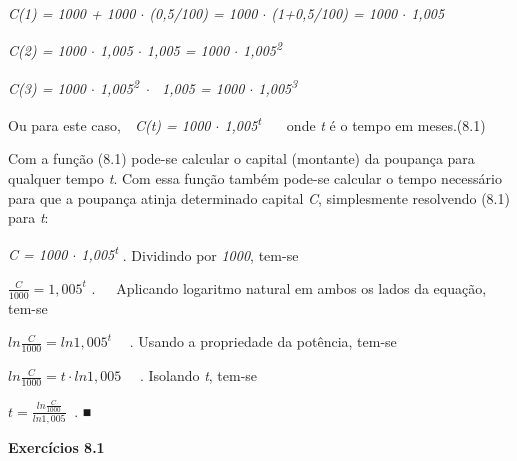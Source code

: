 \documentclass[12pt]{article}
\begin{document}
\vspace{\baselineskip}
\textit{C(1) = 1000 + 1000 $ \cdot $  (0,5/100) = 1000 $ \cdot $  (1+0,5/100) = 1000 $ \cdot $  1,005}\par


\vspace{\baselineskip}
\textit{C(2) = 1000 $ \cdot $  1,005 $ \cdot $  1,005 = 1000 $ \cdot $  1,005\textsuperscript{2}}\par


\vspace{\baselineskip}
\textit{C(3) = 1000 $ \cdot $  1,005\textsuperscript{2}\  $ \cdot $ \ 1,005 =  1000 $ \cdot $  1,005\textsuperscript{3}}\par


\vspace{\baselineskip}
Ou para este caso,\ \  \textit{C(t) = 1000 $ \cdot $  1,005\textsuperscript{t}} \ \ \  onde \textit{t} é o tempo em meses.\tab (8.1)\par


\vspace{\baselineskip}
Com a função (8.1) pode-se calcular o capital (montante) da poupança para qualquer tempo \textit{t}. Com essa função também pode-se calcular o tempo necessário para que a poupança atinja determinado capital \textit{C}, simplesmente resolvendo (8.1) para \textit{t}:\par


\vspace{\baselineskip}
\textit{C = 1000 $ \cdot $  1,005\textsuperscript{t}} . Dividindo por \textit{1000}, tem-se\par

 \( \frac{C}{1000}=1,005^{t} \) .\ \ \  Aplicando logaritmo natural em ambos os lados da equação, tem-se\par


\vspace{\baselineskip}
 \( ln\frac{C}{1000}=ln1,005^{t}~~~~ ^{} \) . Usando a propriedade da potência, tem-se\par


\vspace{\baselineskip}
 \( ln\frac{C}{1000}=t \cdot ln1,005^{}~~~~ ^{} \) . Isolando \textit{t}, tem-se\par


\vspace{\baselineskip}
  \( t=\frac{ln\frac{C}{1000}}{ln1,005}~  \) . ■\par


\vspace{\baselineskip}
\textbf{Exercícios 8.1}\par
\end{document}

